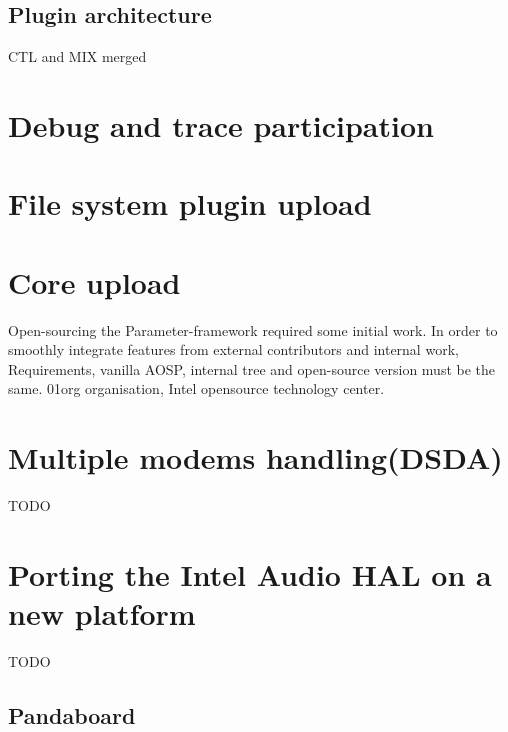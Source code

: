 \subsection{Plugin architecture}
CTL and MIX merged

\section{Debug and trace participation}

\section{File system plugin upload}

\section{Core upload}
Open-sourcing the Parameter-framework required some initial work.
In order to smoothly integrate features from external contributors and internal work,
Requirements, vanilla AOSP, internal tree and open-source version must be the
same.
01org organisation, Intel opensource technology center.

\section{Multiple modems handling(DSDA)}
TODO

\section{Porting the Intel Audio HAL on a new platform}
TODO
\subsection{Pandaboard}

